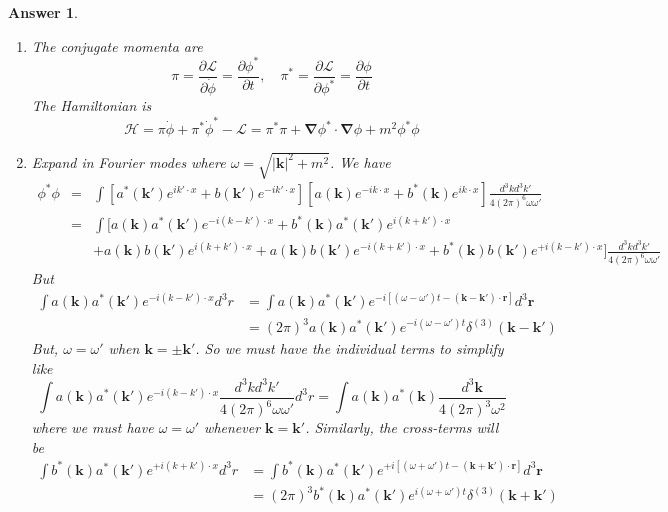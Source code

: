 \documentclass[a4paper]{article}
\newtheorem{ans}{Answer}[section]
\theoremstyle{new}
\begin{document}
\begin{ans}\leavevmode
\begin{enumerate}[label=(\alph*)]
\item The conjugate momenta are
$$\pi=\frac{\partial\mathcal{L}}{\partial\dot{\phi}}=\frac{\partial\phi^*}{\partial t},\quad\pi^*=\frac{\partial\mathcal{L}}{\partial\phi^*}=\frac{\partial\phi}{\partial t}$$
The Hamiltonian is
$$\mathcal{H}=\pi\dot{\phi}+\pi^*\dot{\phi}^*-\mathcal{L}=\pi^*\pi+\boldsymbol{\nabla}\phi^*\cdot\boldsymbol{\nabla}\phi+m^2\phi^*\phi$$
\item Expand in Fourier modes where $\omega=\sqrt{|\mathbf{k}|^2+m^2}$. We have
\begin{eqnarray}
\phi^*\phi&=&\int[a^*(\mathbf{k'})e^{ik'\cdot x}+b(\mathbf{k'})e^{-ik'\cdot x}][a(\mathbf{k})e^{-ik\cdot x}+b^*(\mathbf{k})e^{ik\cdot x}]\frac{d^3kd^3k'}{4(2\pi)^6\omega\omega'}\nonumber\\&=&
\int\bigg[a(\mathbf{k})a^*(\mathbf{k'})e^{-i(k-k')\cdot x}+b^*(\mathbf{k})a^*(\mathbf{k'})e^{i(k+k')\cdot x}\nonumber\\&&+a(\mathbf{k})b(\mathbf{k'})e^{i(k+k')\cdot x}+a(\mathbf{k})b(\mathbf{k'})e^{-i(k+k')\cdot x}+b^*(\mathbf{k})b(\mathbf{k'})e^{+i(k-k')\cdot x}\bigg]\frac{d^3kd^3k'}{4(2\pi)^6\omega\omega'}\nonumber
\end{eqnarray}
But
\begin{align}
    \int a(\mathbf{k})a^*(\mathbf{k'})e^{-i(k-k')\cdot x}d^3r&=\int a(\mathbf{k})a^*(\mathbf{k'})e^{-i[(\omega-\omega')t-(\mathbf{k}-\mathbf{k'})\cdot\mathbf{r}]}d^3\mathbf{r}\nonumber\\&=(2\pi)^3a(\mathbf{k})a^*(\mathbf{k'})e^{-i(\omega-\omega')t}\delta^{(3)}(\mathbf{k}-\mathbf{k'})\tag{a}
\end{align}
But, $\omega=\omega'$ when $\mathbf{k}=\pm\mathbf{k'}$. So we must have the individual terms to simplify like
$$\int a(\mathbf{k})a^*(\mathbf{k'})e^{-i(k-k')\cdot x}\frac{d^3kd^3k'}{4(2\pi)^6\omega\omega'}d^3r=\int a(\mathbf{k})a^*(\mathbf{k})\frac{d^3\mathbf{k}}{4(2\pi)^3\omega^2}$$
where we must have $\omega=\omega'$ whenever $\mathbf{k}=\mathbf{k'}$. Similarly, the cross-terms will be
\begin{align}
    \int b^*(\mathbf{k})a^*(\mathbf{k'})e^{+i(k+k')\cdot x}d^3r&=\int b^*(\mathbf{k})a^*(\mathbf{k'})e^{+i[(\omega+\omega')t-(\mathbf{k}+\mathbf{k'})\cdot\mathbf{r}]}d^3\mathbf{r}\nonumber\\&=(2\pi)^3b^*(\mathbf{k})a^*(\mathbf{k'})e^{i(\omega+\omega')t}\delta^{(3)}(\mathbf{k}+\mathbf{k'})\tag{b}\\

\end{align}
\end{enumerate}
\end{ans}
\end{document}
